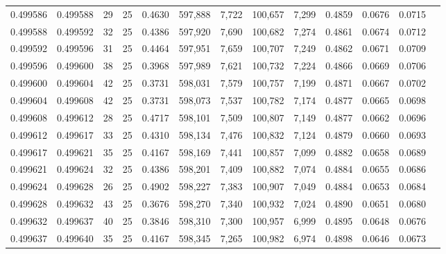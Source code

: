 \begin{tabular}{rrrrrrrrrrrrr}
0.499586 & 0.499588 &    29 &  25 &                                     0.4630 & 597,888 &   7,722 & 100,657 &   7,299 & 0.4859 & 0.0676 & 0.0715 \\
0.499588 & 0.499592 &    32 &  25 &                                     0.4386 & 597,920 &   7,690 & 100,682 &   7,274 & 0.4861 & 0.0674 & 0.0712 \\
0.499592 & 0.499596 &    31 &  25 &                                     0.4464 & 597,951 &   7,659 & 100,707 &   7,249 & 0.4862 & 0.0671 & 0.0709 \\
0.499596 & 0.499600 &    38 &  25 &                                     0.3968 & 597,989 &   7,621 & 100,732 &   7,224 & 0.4866 & 0.0669 & 0.0706 \\
0.499600 & 0.499604 &    42 &  25 &                                     0.3731 & 598,031 &   7,579 & 100,757 &   7,199 & 0.4871 & 0.0667 & 0.0702 \\
0.499604 & 0.499608 &    42 &  25 &                                     0.3731 & 598,073 &   7,537 & 100,782 &   7,174 & 0.4877 & 0.0665 & 0.0698 \\
0.499608 & 0.499612 &    28 &  25 &                                     0.4717 & 598,101 &   7,509 & 100,807 &   7,149 & 0.4877 & 0.0662 & 0.0696 \\
0.499612 & 0.499617 &    33 &  25 &                                     0.4310 & 598,134 &   7,476 & 100,832 &   7,124 & 0.4879 & 0.0660 & 0.0693 \\
0.499617 & 0.499621 &    35 &  25 &                                     0.4167 & 598,169 &   7,441 & 100,857 &   7,099 & 0.4882 & 0.0658 & 0.0689 \\
0.499621 & 0.499624 &    32 &  25 &                                     0.4386 & 598,201 &   7,409 & 100,882 &   7,074 & 0.4884 & 0.0655 & 0.0686 \\
0.499624 & 0.499628 &    26 &  25 &                                     0.4902 & 598,227 &   7,383 & 100,907 &   7,049 & 0.4884 & 0.0653 & 0.0684 \\
0.499628 & 0.499632 &    43 &  25 &                                     0.3676 & 598,270 &   7,340 & 100,932 &   7,024 & 0.4890 & 0.0651 & 0.0680 \\
0.499632 & 0.499637 &    40 &  25 &                                     0.3846 & 598,310 &   7,300 & 100,957 &   6,999 & 0.4895 & 0.0648 & 0.0676 \\
0.499637 & 0.499640 &    35 &  25 &                                     0.4167 & 598,345 &   7,265 & 100,982 &   6,974 & 0.4898 & 0.0646 & 0.0673 \\

\end{tabular}
